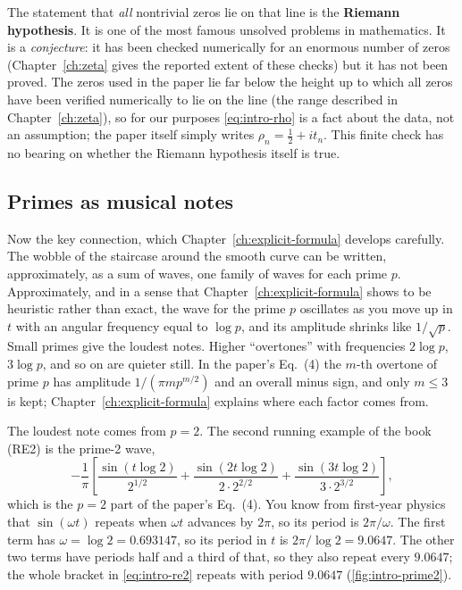 The statement that \emph{all} nontrivial zeros lie on that line is the \textbf{Riemann hypothesis}. It is one of the most famous unsolved problems in mathematics. It is a \emph{conjecture}: it has been checked numerically for an enormous number of zeros (Chapter~\ref{ch:zeta} gives the reported extent of these checks) but it has not been proved. The zeros used in the paper lie far below the height up to which all zeros have been verified numerically to lie on the line (the range described in Chapter~\ref{ch:zeta}), so for our purposes \cref{eq:intro-rho} is a fact about the data, not an assumption; the paper itself simply writes $\rho_n = \tfrac12 + i t_n$. This finite check has no bearing on whether the Riemann hypothesis itself is true.

\subsection{Primes as musical notes}

Now the key connection, which Chapter~\ref{ch:explicit-formula} develops carefully. The wobble of the staircase around the smooth curve can be written, approximately, as a sum of waves, one family of waves for each prime $p$. Approximately, and in a sense that Chapter~\ref{ch:explicit-formula} shows to be heuristic rather than exact, the wave for the prime $p$ oscillates as you move up in $t$ with an angular frequency equal to $\log p$, and its amplitude shrinks like $1/\sqrt p$. Small primes give the loudest notes. Higher ``overtones'' with frequencies $2\log p$, $3\log p$, and so on are quieter still. In the paper's Eq.~(4) the $m$-th overtone of prime $p$ has amplitude $1/(\pi m p^{m/2})$ and an overall minus sign, and only $m \le 3$ is kept; Chapter~\ref{ch:explicit-formula} explains where each factor comes from.

The loudest note comes from $p=2$. The second running example of the book (RE2) is the prime-2 wave,
\begin{equation}
-\frac{1}{\pi}\left[\frac{\sin(t\log 2)}{2^{1/2}} + \frac{\sin(2t\log 2)}{2\cdot 2^{2/2}} + \frac{\sin(3t\log 2)}{3\cdot 2^{3/2}}\right],
\label{eq:intro-re2}
\end{equation}
which is the $p=2$ part of the paper's Eq.~(4). You know from first-year physics that $\sin(\omega t)$ repeats when $\omega t$ advances by $2\pi$, so its period is $2\pi/\omega$. The first term has $\omega = \log 2 = 0.693147$, so its period in $t$ is $2\pi/\log 2 = 9.0647$. The other two terms have periods half and a third of that, so they also repeat every $9.0647$; the whole bracket in \cref{eq:intro-re2} repeats with period $9.0647$ (\cref{fig:intro-prime2}).

